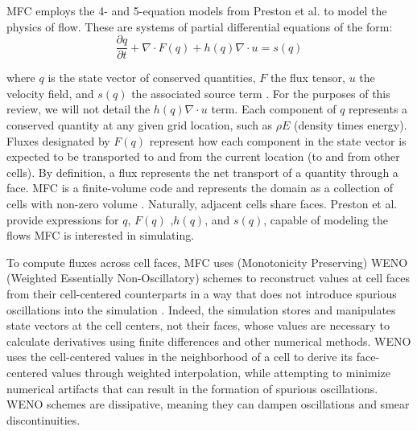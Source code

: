 MFC employs the 4- and 5-equation models from Preston et al. \cite{ALLAIRE2002577} to model the physics
of flow. These are systems of partial differential equations of the form:
%
\begin{equation}
    \frac{\partial q}{\partial t} + \nabla \cdot F(q) + h(q)\nabla\cdot u = s(q)
\end{equation}

\noindent where $q$ is the state vector of conserved quantities, $F$ the flux tensor,
$u$ the velocity field, and $s(q)$ the associated source term \cite{Bryngelson_2021}.
For the purposes of this review, we will not detail the $h(q)\nabla\cdot u$ term.
Each component of $q$ represents a conserved quantity at any given grid location,
such as $\rho E$ (density times energy). Fluxes designated by $F(q)$ 
represent how each component in the state vector is expected to be transported
to and from the current location (to and from other cells). By definition, a flux
represents the net transport of a quantity through a face. MFC is a finite-volume
code and represents the domain as a collection of cells with non-zero volume \cite{Bryngelson_2021}.
Naturally, adjacent cells share faces. Preston et al. \cite{ALLAIRE2002577} provide
expressions for $q$, $F(q)$ ,$h(q)$, and $s(q)$, capable of modeling the flows MFC
is interested in simulating.

To compute fluxes across cell faces, MFC uses (Monotonicity Preserving) WENO
(Weighted Essentially Non-Oscillatory) schemes to reconstruct values at cell
faces from their cell-centered counterparts in a way that does not introduce
spurious oscillations into the simulation \cite{CORALIC201495,JOHNSEN2006715}.
Indeed, the simulation stores and manipulates state vectors at the cell centers,
not their faces, whose values are necessary to calculate derivatives using finite
differences and other numerical methods. WENO uses the cell-centered values in the
neighborhood of a cell to derive its face-centered values through weighted
interpolation, while attempting to minimize numerical artifacts that can result
in the formation of spurious oscillations. WENO schemes are dissipative, meaning
they can dampen oscillations and smear discontinuities.

